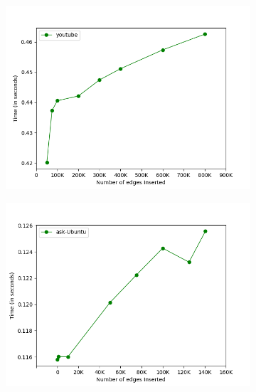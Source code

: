 \documentclass[a4paper]{article}
\begin{document}
\begin{figure}[H]
    \centering
    \begin{subfigure}[b]{0.32\textwidth}
         \centering
         \includegraphics[width=\textwidth]{img/ins/i3.png}
         \caption{}
         \label{fig:insert_trend_1}
    \end{subfigure}
    \hfill
    \begin{subfigure}[b]{0.32\textwidth}
         \centering
         \includegraphics[width=\textwidth]{img/ins/i1.png}
         \caption{}
         \label{fig:insert_trend_2}
    \end{subfigure}
    \hfill
    \begin{subfigure}[b]{0.32\textwidth}
         \centering

\end{subfigure}
\end{figure}
\end{document}
